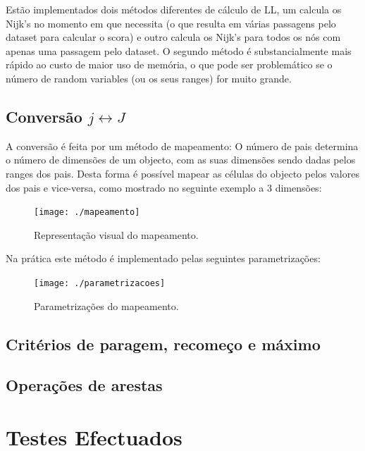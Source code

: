 \documentclass[10pt]{article}
\numberwithin{equation}{section}
\begin{document}
Estão implementados dois métodos diferentes de cálculo de LL, um calcula os Nijk's no momento em que necessita (o que resulta em várias passagens pelo dataset para calcular o scora) e outro calcula os Nijk's para todos os nós com apenas uma passagem pelo dataset. O segundo método é substancialmente mais rápido ao custo de maior uso de memória, o que pode ser problemático se o número de random variables (ou os seus ranges) for muito grande.

\subsection{Conversão $j \leftrightarrow J$}
A conversão é feita por um método de mapeamento: 
O número de pais determina o número de dimensões de um objecto, com as suas dimensões sendo dadas pelos ranges dos pais. Desta forma é possível mapear as células do objecto pelos valores dos pais e vice-versa, como mostrado no seguinte exemplo a 3 dimensões:

\begin{figure}[H]
	\centering
	\texttt{[image: ./mapeamento]}
	\caption{Representação visual do mapeamento.}
	\vspace{-0.8em}
\end{figure}

Na prática este método é implementado pelas seguintes parametrizações:

\begin{figure}[H]
	\centering
	\texttt{[image: ./parametrizacoes]}
	\caption{Parametrizações do mapeamento.}
	\vspace{-0.8em}
\end{figure}

\subsection{Critérios de paragem, recomeço e máximo}


\subsection{Operações de arestas}




\section{Testes Efectuados}
\end{document}
